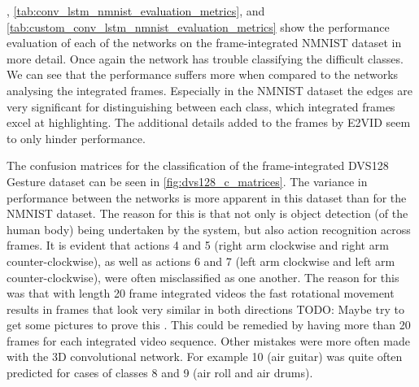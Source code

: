 , \cref{tab:conv_lstm_nmnist_evaluation_metrics}, and \cref{tab:custom_conv_lstm_nmnist_evaluation_metrics} show the performance evaluation of each of the networks on the frame-integrated NMNIST dataset in more detail. Once again the network has trouble classifying the difficult classes. We can see that the performance suffers more when compared to the networks analysing the integrated frames. Especially in the NMNIST dataset the edges are very significant for distinguishing between each class, which integrated frames excel at highlighting. The additional details added to the frames by E2VID seem to only hinder performance.

\vspace{10pt}

The confusion matrices for the classification of the frame-integrated DVS128 Gesture dataset can be seen in \cref{fig:dvs128_c_matrices}. The variance in performance between the networks is more apparent in this dataset than for the NMNIST dataset. The reason for this is that not only is object detection (of the human body) being undertaken by the system, but also action recognition across frames. It is evident that actions 4 and 5 (right arm clockwise and right arm counter-clockwise), as well as actions 6 and 7 (left arm clockwise and left arm counter-clockwise), were often misclassified as one another. The reason for this was that with length 20 frame integrated videos the fast rotational movement results in frames that look very similar in both directions \color{red} TODO: Maybe try to get some pictures to prove this \color{black}. This could be remedied by having more than 20 frames for each integrated video sequence. Other mistakes were more often made with the 3D convolutional network. For example 10 (air guitar) was quite often predicted for cases of classes 8 and 9 (air roll and air drums). 

